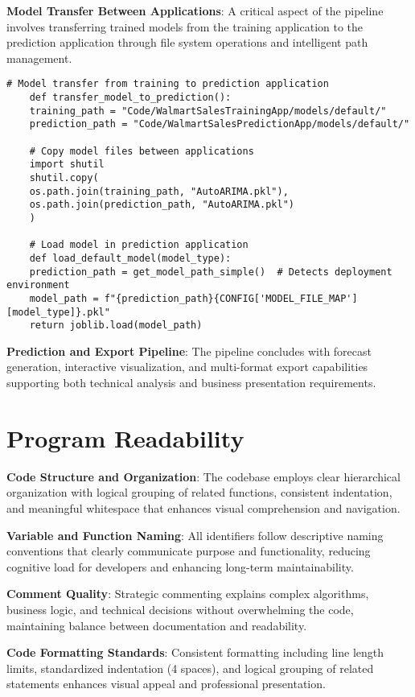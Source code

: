 \textbf{Model Transfer Between Applications}: A critical aspect of the pipeline involves transferring trained models from the training application to the prediction application through file system operations and intelligent path management.

\begin{lstlisting}[style=bashstyle, caption={Model Transfer and Loading}]
	# Model transfer from training to prediction application
	def transfer_model_to_prediction():
	training_path = "Code/WalmartSalesTrainingApp/models/default/"
	prediction_path = "Code/WalmartSalesPredictionApp/models/default/"
	
	# Copy model files between applications
	import shutil
	shutil.copy(
	os.path.join(training_path, "AutoARIMA.pkl"),
	os.path.join(prediction_path, "AutoARIMA.pkl")
	)
	
	# Load model in prediction application
	def load_default_model(model_type):
	prediction_path = get_model_path_simple()  # Detects deployment environment
	model_path = f"{prediction_path}{CONFIG['MODEL_FILE_MAP'][model_type]}.pkl"
	return joblib.load(model_path)
\end{lstlisting}

\textbf{Prediction and Export Pipeline}: The pipeline concludes with forecast generation, interactive visualization, and multi-format export capabilities supporting both technical analysis and business presentation requirements.

\section{Program Readability}

\textbf{Code Structure and Organization}: The codebase employs clear hierarchical organization with logical grouping of related functions, consistent indentation, and meaningful whitespace that enhances visual comprehension and navigation.

\textbf{Variable and Function Naming}: All identifiers follow descriptive naming conventions that clearly communicate purpose and functionality, reducing cognitive load for developers and enhancing long-term maintainability.

\textbf{Comment Quality}: Strategic commenting explains complex algorithms, business logic, and technical decisions without overwhelming the code, maintaining balance between documentation and readability.

\textbf{Code Formatting Standards}: Consistent formatting including line length limits, standardized indentation (4 spaces), and logical grouping of related statements enhances visual appeal and professional presentation.

